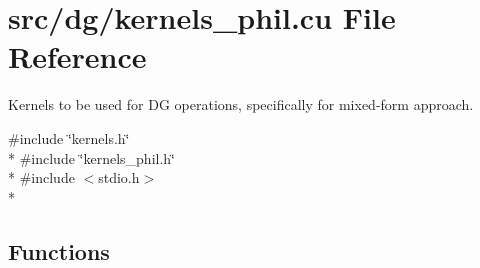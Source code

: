 \section{src/dg/kernels\-\_\-phil.cu File Reference}
\label{kernels__phil_8cu}


Kernels to be used for D\-G operations, specifically for mixed-\/form approach.  


{\ttfamily \#include \char`\"{}kernels.\-h\char`\"{}}\\*
{\ttfamily \#include \char`\"{}kernels\-\_\-phil.\-h\char`\"{}}\\*
{\ttfamily \#include $<$stdio.\-h$>$}\\*
\subsection*{Functions}
